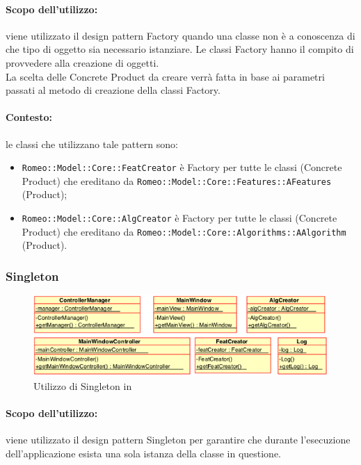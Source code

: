 \paragraph{Scopo dell'utilizzo:} viene utilizzato il design pattern\glossario{} Factory quando una classe non è a conoscenza di che tipo di oggetto sia necessario istanziare.
Le classi Factory hanno il compito di provvedere alla creazione di oggetti.
\\La scelta delle Concrete Product da creare verrà fatta in base ai parametri passati al metodo di creazione della classi Factory.
\paragraph{Contesto:} le classi che utilizzano tale pattern sono:
\begin{itemize}
	\item \verb!Romeo::Model::Core::FeatCreator! è Factory per tutte le classi (Concrete Product) che ereditano da \verb!Romeo::Model::Core::Features::AFeatures! (Product);
	\item \verb!Romeo::Model::Core::AlgCreator! è Factory per tutte le classi (Concrete Product) che ereditano da \verb!Romeo::Model::Core::Algorithms::AAlgorithm! (Product).
\end{itemize}
\pagebreak
\subsubsection{Singleton}
\label{creaz_singleton}
\begin{figure}[!h]
	\centering
	\includegraphics[width=1.1\linewidth]{./Content/Immagini/Singleton_dp.png}
	\caption{Utilizzo di Singleton in \project{}}
	\label{romeo_singleton}
\end{figure}
\paragraph{Scopo dell'utilizzo:} viene utilizzato il design pattern\glossario{} Singleton per garantire che durante l'esecuzione dell'applicazione esista una sola istanza della classe in questione.
